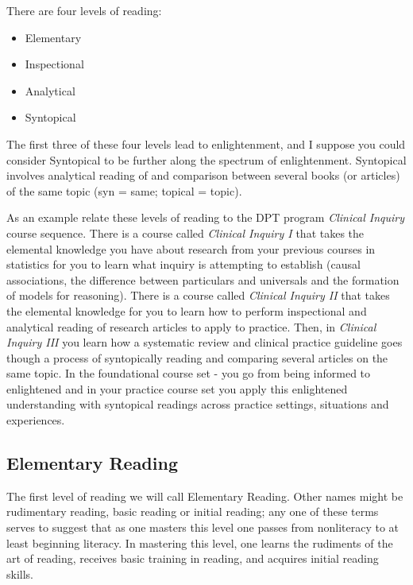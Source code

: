 There are four levels of reading: 

\begin{itemize}
\item{Elementary}
\item{Inspectional}
\item{Analytical}
\item{Syntopical}
\end{itemize}

The first three of these four levels lead to enlightenment, and I suppose you could consider Syntopical to be further along the spectrum of enlightenment. Syntopical involves analytical reading of and comparison between several books (or articles) of the same topic (syn = same; topical = topic). 

As an example relate these levels of reading to the DPT program \textit{Clinical Inquiry} course sequence. There is a course called \textit{Clinical Inquiry I} that takes the elemental knowledge you have about research from your previous courses in statistics for you to learn what inquiry is attempting to establish (causal associations, the difference between particulars and universals and the formation of models for reasoning). There is a course called \textit{Clinical Inquiry II} that takes the elemental knowledge for you to learn how to perform inspectional and analytical reading of research articles to apply to practice. Then, in \textit{Clinical Inquiry III} you learn how a systematic review and clinical practice guideline goes though a process of syntopically reading and comparing several articles on the same topic. In the foundational course set - you go from being informed to enlightened and in your practice course set you apply this enlightened understanding with syntopical readings across practice settings, situations and experiences.

\subsection{Elementary Reading}

\begin{displayquote}
The first level of reading we will call Elementary Reading. Other names might be rudimentary reading, basic reading or initial reading; any one of these terms serves to suggest that as one masters this level one passes from nonliteracy to at least beginning literacy. In mastering this level, one learns the rudiments of the art of reading, receives basic training in reading, and acquires initial reading skills.
\end{displayquote}

